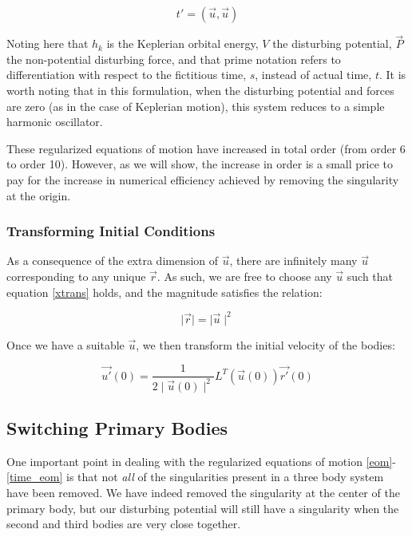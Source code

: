 \documentclass[11pt,twoside,letterpaper]{article}
\begin{document}
  \begin{equation} \label{time_eom}
    t' = \left(\vec{u}, \vec{u}\right)
  \end{equation}

  Noting here that \(h_k\) is the Keplerian orbital energy, \(V\) the
  disturbing potential, \(\vec{P}\) the non-potential disturbing
  force, and that prime notation refers to differentiation with
  respect to the fictitious time, \(s\), instead of actual time,
  \(t\). It is worth noting that in this formulation, when the
  disturbing potential and forces are zero (as in the case of
  Keplerian motion), this system reduces to a simple harmonic
  oscillator.

  These regularized equations of motion have increased in total order
  (from order 6 to order 10). However, as we will show, the increase
  in order is a small price to pay for the increase in numerical
  efficiency achieved by removing the singularity at the origin.

  \subsubsection{Transforming Initial Conditions}
  As a consequence of the extra dimension of \(\vec{u}\), there are
  infinitely many \(\vec{u}\) corresponding to any unique
  \(\vec{r}\). As such, we are free to choose any \(\vec{u}\) such
  that equation \ref{xtrans} holds, and the magnitude satisfies the
  relation:

  \begin{equation} \label{umag}
    \mid\vec{r}\mid = \mid\vec{u}\mid^2
  \end{equation}

  Once we have a suitable \(\vec{u}\), we then transform the initial
  velocity of the bodies:

  \begin{equation} \label{initial_velocity}
    \vec{u'}(0) = \frac{1}{2\mid\vec{u}(0)\mid^2}L^T\left(\vec{u}(0)\right)\vec{r'}(0)
  \end{equation}
  
  
  \subsection{Switching Primary Bodies}
  One important point in dealing with the regularized equations of
  motion \ref{eom}-\ref{time_eom} is that not \textit{all} of the
  singularities present in a three body system have been removed. We
  have indeed removed the singularity at the center of the primary
  body, but our disturbing potential will still have a singularity
  when the second and third bodies are very close together.
\end{document}

